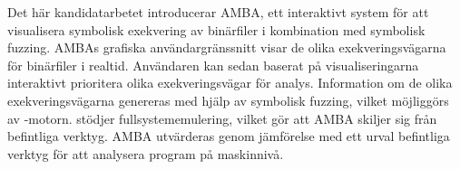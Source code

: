 Det här kandidatarbetet introducerar AMBA, ett interaktivt system för att visualisera symbolisk exekvering av binärfiler i kombination med symbolisk fuzzing.
AMBAs grafiska användargränssnitt visar de olika exekveringsvägarna för binärfiler i realtid.
Användaren kan sedan baserat på visualiseringarna interaktivt prioritera olika exekveringsvägar för analys.
Information om de olika exekveringsvägarna genereras med hjälp av symbolisk fuzzing, vilket möjliggörs av \stoe{}-motorn.
\stoe{} stödjer fullsystememulering, vilket gör att AMBA skiljer sig från befintliga verktyg.
AMBA utvärderas genom jämförelse med ett urval befintliga verktyg för att analysera program på maskinnivå.
